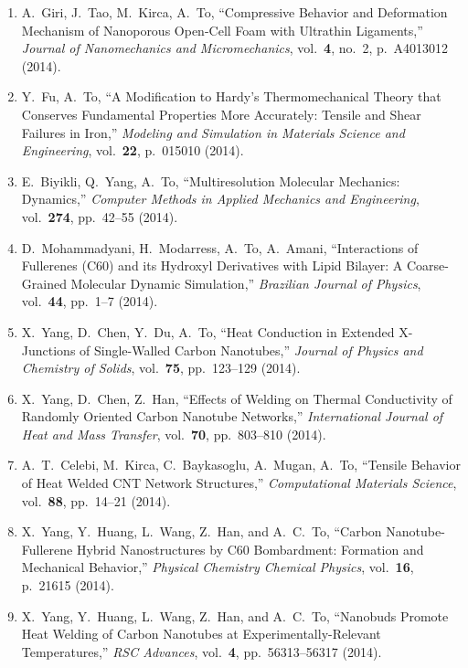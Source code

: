 \begin{enumerate}
\item A.\ Giri, J.\ Tao, M.\ Kirca, A.\ To, ``Compressive Behavior and Deformation Mechanism of Nanoporous Open-Cell Foam with Ultrathin Ligaments,'' \textit{Journal of Nanomechanics and Micromechanics}, vol.\ \textbf{4}, no.\ 2, p.\ A4013012 (2014).

\item Y.\ Fu, A.\ To, ``A Modification to Hardy's Thermomechanical Theory that Conserves Fundamental Properties More Accurately: Tensile and Shear Failures in Iron,'' \textit{Modeling and Simulation in Materials Science and Engineering}, vol.\ \textbf{22}, p.\ 015010 (2014).

\item E.\ Biyikli, Q.\ Yang, A.\ To, ``Multiresolution Molecular Mechanics: Dynamics,'' \textit{Computer Methods in Applied Mechanics and Engineering}, vol.\ \textbf{274}, pp.\ 42--55 (2014).

\item D.\ Mohammadyani, H.\ Modarress, A.\ To, A.\ Amani, ``Interactions of Fullerenes (C60) and its Hydroxyl Derivatives with Lipid Bilayer: A   Coarse-Grained Molecular Dynamic Simulation,'' \textit{Brazilian Journal of Physics}, vol.\ \textbf{44}, pp.\ 1--7 (2014).

\item X.\ Yang, D.\ Chen, Y.\ Du, A.\ To, ``Heat Conduction in Extended X-Junctions of Single-Walled Carbon Nanotubes,'' \textit{Journal of Physics and Chemistry of Solids}, vol.\ \textbf{75}, pp.\ 123--129 (2014).

\item X.\ Yang, D.\ Chen, Z.\ Han, ``Effects of Welding on Thermal Conductivity of Randomly Oriented Carbon Nanotube Networks,'' \textit{International Journal of Heat and Mass Transfer}, vol.\ \textbf{70}, pp.\ 803--810 (2014).

\item A.\ T.\ Celebi, M.\ Kirca, C.\ Baykasoglu, A.\ Mugan, A.\ To, ``Tensile Behavior of Heat Welded CNT Network Structures,'' \textit{Computational Materials Science}, vol.\ \textbf{88}, pp.\ 14--21 (2014).

\item X.\ Yang, Y.\ Huang, L.\ Wang, Z.\ Han, and A.\ C.\ To, ``Carbon Nanotube-Fullerene Hybrid Nanostructures by C60 Bombardment: Formation and Mechanical Behavior,'' \textit{Physical Chemistry Chemical Physics}, vol.\ \textbf{16}, p.\ 21615 (2014).

\item X.\ Yang, Y.\ Huang, L.\ Wang, Z.\ Han, and A.\ C.\ To, ``Nanobuds Promote Heat Welding of Carbon Nanotubes at Experimentally-Relevant   Temperatures,'' \textit{RSC Advances}, vol.\ \textbf{4}, pp.\ 56313--56317 (2014).


\end{enumerate}
